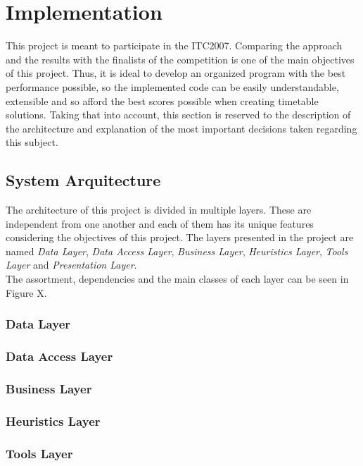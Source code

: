 \chapter{Implementation}
\label{implementation}
\thispagestyle{plain}

This project is meant to participate in the ITC2007. Comparing the approach and the results with the finalists of the competition is one of the main objectives of this project. Thus, it is ideal to develop an organized program with the best performance possible, so the implemented code can be easily understandable, extensible and so afford the best scores possible when creating timetable solutions. Taking that into account, this section is reserved to the description of the architecture and explanation of the most important decisions taken regarding this subject.

\section{System Arquitecture}

The architecture of this project is divided in multiple layers. These are independent from one another and each of them has its unique features considering the objectives of this project. The layers presented in the project are named \textit{Data Layer}, \textit{Data Access Layer}, \textit{Business Layer}, \textit{Heuristics Layer}, \textit{Tools Layer} and \textit{Presentation Layer}. \\

The assortment, dependencies and the main classes of each layer can be seen in Figure X.

\subsection{Data Layer}
\subsection{Data Access Layer}
\subsection{Business Layer}
\subsection{Heuristics Layer}
\subsection{Tools Layer}
